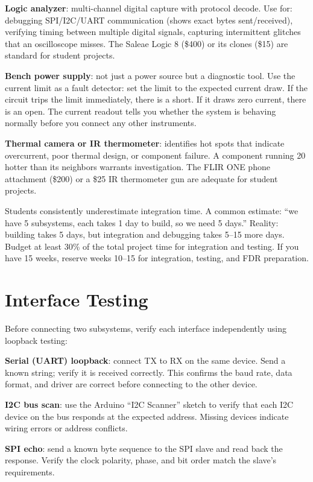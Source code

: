 \textbf{Logic analyzer}: multi-channel digital capture with protocol decode. Use for: debugging SPI/I2C/UART communication (shows exact bytes sent/received), verifying timing between multiple digital signals, capturing intermittent glitches that an oscilloscope misses. The Saleae Logic 8 (\$400) or its clones (\$15) are standard for student projects.

\textbf{Bench power supply}: not just a power source but a diagnostic tool. Use the current limit as a fault detector: set the limit to the expected current draw. If the circuit trips the limit immediately, there is a short. If it draws zero current, there is an open. The current readout tells you whether the system is behaving normally before you connect any other instruments.

\textbf{Thermal camera or IR thermometer}: identifies hot spots that indicate overcurrent, poor thermal design, or component failure. A component running 20\,\degC{} hotter than its neighbors warrants investigation. The FLIR ONE phone attachment (\$200) or a \$25 IR thermometer gun are adequate for student projects.

\begin{warningbox}
Students consistently underestimate integration time. A common estimate: ``we have 5 subsystems, each takes 1 day to build, so we need 5 days.'' Reality: building takes 5 days, but integration and debugging takes 5--15 more days. Budget at least 30\% of the total project time for integration and testing. If you have 15 weeks, reserve weeks 10--15 for integration, testing, and FDR preparation.
\end{warningbox}
\section{Interface Testing}
Before connecting two subsystems, verify each interface independently using loopback testing:

\textbf{Serial (UART) loopback}: connect TX to RX on the same device. Send a known string; verify it is received correctly. This confirms the baud rate, data format, and driver are correct before connecting to the other device.

\textbf{I2C bus scan}: use the Arduino ``I2C Scanner'' sketch to verify that each I2C device on the bus responds at the expected address. Missing devices indicate wiring errors or address conflicts.

\textbf{SPI echo}: send a known byte sequence to the SPI slave and read back the response. Verify the clock polarity, phase, and bit order match the slave's requirements.

